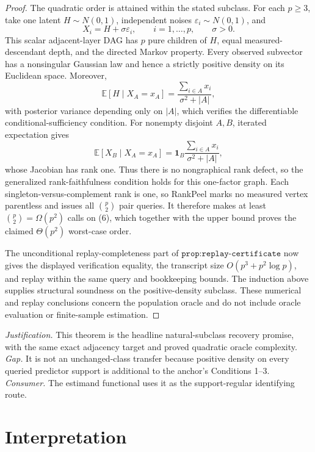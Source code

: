 \documentclass{article}
\begin{document}
\begin{proof}
The quadratic order is attained within the stated subclass.  For each \(p\geq3\), take one latent \(H\sim N(0,1)\), independent noises \(\varepsilon_i\sim N(0,1)\), and
\[
 X_i=H+\sigma\varepsilon_i,
 \qquad i=1,\ldots,p,
 \qquad \sigma>0. \tag{6}
\]
This scalar adjacent-layer DAG has \(p\) pure children of \(H\), equal measured-descendant depth, and the directed Markov property.  Every observed subvector has a nonsingular Gaussian law and hence a strictly positive density on its Euclidean space.  Moreover,
\[
 \mathbb E[H\mid X_A=x_A]
 =\frac{\sum_{i\in A}x_i}{\sigma^2+|A|}, \tag{7}
\]
with posterior variance depending only on \(|A|\), which verifies the differentiable conditional-sufficiency condition.  For nonempty disjoint \(A,B\), iterated expectation gives
\[
 \mathbb E[X_B\mid X_A=x_A]
 =\mathbf 1_B\frac{\sum_{i\in A}x_i}{\sigma^2+|A|}, \tag{8}
\]
whose Jacobian has rank one.  Thus there is no nongraphical rank defect, so the generalized rank-faithfulness condition holds for this one-factor graph.  Each singleton-versus-complement rank is one, so RankPeel marks no measured vertex parentless and issues all \(\binom p2\) pair queries.  It therefore makes at least \(\binom p2=\Omega(p^2)\) calls on (6), which together with the upper bound proves the claimed \(\Theta(p^2)\) worst-case order.

The unconditional replay-completeness part of \(\texttt{prop:replay-certificate}\) now gives the displayed verification equality, the transcript size \(O(p^3+p^2\log p)\), and replay within the same query and bookkeeping bounds.  The induction above supplies structural soundness on the positive-density subclass.  These numerical and replay conclusions concern the population oracle and do not include oracle evaluation or finite-sample estimation.
\end{proof}
\par\smallskip\noindent \textit{Justification.} This theorem is the headline natural-subclass recovery promise, with the same exact adjacency target and proved quadratic oracle complexity. \textit{Gap.} It is not an unchanged-class transfer because positive density on every queried predictor support is additional to the anchor's Conditions 1--3. \textit{Consumer.} The estimand functional uses it as the support-regular identifying route.

\section{Interpretation}
\end{document}
